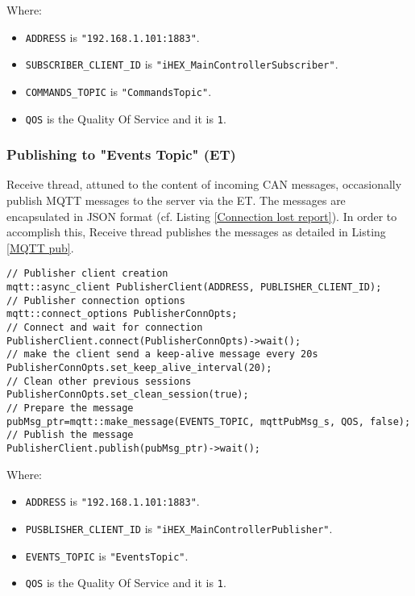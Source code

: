 Where:
\begin{itemize}
    \item \texttt{ADDRESS} is \texttt{"192.168.1.101:1883"}.
    \item \texttt{SUBSCRIBER\_CLIENT\_ID} is \texttt{"iHEX\_MainControllerSubscriber"}.
    \item \texttt{COMMANDS\_TOPIC} is \texttt{"CommandsTopic"}.
    \item \texttt{QOS} is the Quality Of Service and it is \texttt{1}.
\end{itemize} 

\subsubsection{Publishing to "Events Topic" (ET)}
Receive thread, attuned to the content of incoming CAN messages, occasionally publish MQTT messages to the server via the ET. The messages are encapsulated in JSON format (cf. Listing \ref{Connection lost report}).
In order to accomplish this, Receive thread publishes the messages as detailed in Listing \ref{MQTT pub}.

\begin{adjustwidth}{2em}{0pt}
\begin{lstlisting}[style=cppStyle]
// Publisher client creation
mqtt::async_client PublisherClient(ADDRESS, PUBLISHER_CLIENT_ID);
// Publisher connection options
mqtt::connect_options PublisherConnOpts;
// Connect and wait for connection
PublisherClient.connect(PublisherConnOpts)->wait();
// make the client send a keep-alive message every 20s
PublisherConnOpts.set_keep_alive_interval(20);
// Clean other previous sessions
PublisherConnOpts.set_clean_session(true);
// Prepare the message
pubMsg_ptr=mqtt::make_message(EVENTS_TOPIC, mqttPubMsg_s, QOS, false);
// Publish the message
PublisherClient.publish(pubMsg_ptr)->wait();
\end{lstlisting}
\captionsetup{type=lstlisting}
\label{MQTT pub}
\end{adjustwidth}

Where:
\begin{itemize}
    \item \texttt{ADDRESS} is \texttt{"192.168.1.101:1883"}.
    \item \texttt{PUSBLISHER\_CLIENT\_ID} is \texttt{"iHEX\_MainControllerPublisher"}.
    \item \texttt{EVENTS\_TOPIC} is \texttt{"EventsTopic"}.
    \item \texttt{QOS} is the Quality Of Service and it is \texttt{1}.
\end{itemize}

